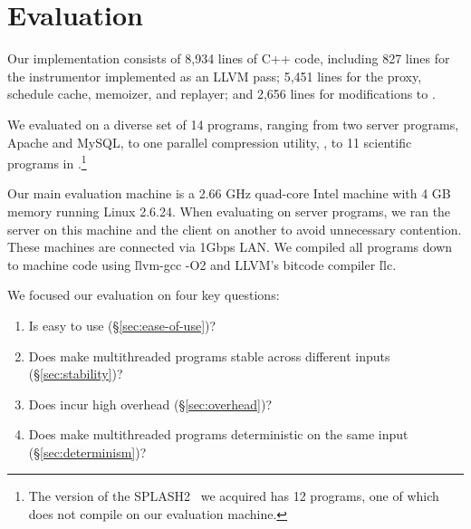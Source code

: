 \section{Evaluation}
\label{sec:evaluation}

Our \tern implementation consists of 8,934 lines of C++ code, including 827
lines for the instrumentor implemented as an LLVM pass; 5,451 lines for
the proxy, schedule cache, memoizer, and replayer; and 2,656 lines for
modifications to \klee.

We evaluated \tern on a diverse set of 14 programs, ranging from two server
programs, Apache and MySQL, to one parallel compression utility, \pbzip, to
11 scientific programs in \splash.\footnote{The version of the
  SPLASH2~\cite{lu:bugbench} we acquired has 12 programs, one of which does
  not compile on our evaluation machine.}

Our main evaluation machine is a 2.66 GHz quad-core Intel machine with 4
GB memory running Linux 2.6.24.  When evaluating \tern on server programs, we
ran the server on this machine and the client on another to avoid
unnecessary contention.  These machines are connected via 1Gbps LAN.  We
compiled all programs down to machine code using \v{llvm-gcc -O2} and
LLVM's bitcode compiler \v{llc}.

We focused our evaluation on four key questions:
\begin{enumerate}

\item Is \tern easy to use (\S\ref{sec:ease-of-use})?

\item Does \tern make multithreaded programs stable across different inputs
  (\S\ref{sec:stability})?

\item Does \tern incur high overhead (\S\ref{sec:overhead})?

\item Does \tern make multithreaded programs deterministic on the same
  input (\S\ref{sec:determinism})?

\end{enumerate}





